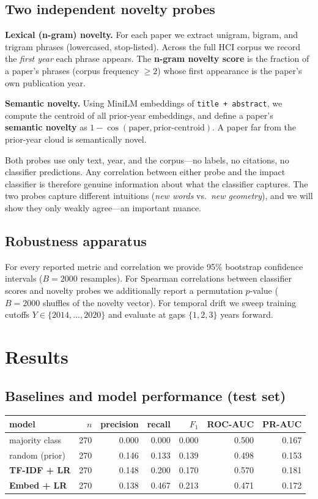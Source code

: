 \documentclass[11pt]{article}
\begin{document}
\subsection{Two independent novelty probes}
\textbf{Lexical (n-gram) novelty.} For each paper we extract unigram, bigram, and trigram phrases (lowercased, stop-listed). Across the full HCI corpus we record the \emph{first year} each phrase appears. The \textbf{n-gram novelty score} is the fraction of a paper's phrases (corpus frequency $\ge 2$) whose first appearance is the paper's own publication year.

\textbf{Semantic novelty.} Using MiniLM embeddings of \texttt{title + abstract}, we compute the centroid of all prior-year embeddings, and define a paper's \textbf{semantic novelty} as $1 - \cos(\text{paper}, \text{prior-centroid})$. A paper far from the prior-year cloud is semantically novel.

Both probes use only text, year, and the corpus---no labels, no citations, no classifier predictions. Any correlation between either probe and the impact classifier is therefore genuine information about what the classifier captures. The two probes capture different intuitions (\emph{new words} vs.\ \emph{new geometry}), and we will show they only weakly agree---an important nuance.

\subsection{Robustness apparatus}
For every reported metric and correlation we provide 95\% bootstrap confidence intervals ($B=2000$ resamples). For Spearman correlations between classifier scores and novelty probes we additionally report a permutation $p$-value ($B=2000$ shuffles of the novelty vector). For temporal drift we sweep training cutoffs $Y \in \{2014, \ldots, 2020\}$ and evaluate at gaps $\{1,2,3\}$ years forward.

\section{Results}
\subsection{Baselines and model performance (test set)}
\begin{table}[h]\centering
\begin{tabular}{lrrrrrr}
\toprule
model & $n$ & precision & recall & $F_1$ & ROC-AUC & PR-AUC \\
\midrule
majority class & 270 & 0.000 & 0.000 & 0.000 & 0.500 & 0.167 \\
random (prior) & 270 & 0.146 & 0.133 & 0.139 & 0.498 & 0.153 \\
\textbf{TF-IDF + LR} & 270 & 0.148 & 0.200 & 0.170 & 0.570 & 0.181 \\
\textbf{Embed + LR}  & 270 & 0.138 & 0.467 & 0.213 & 0.471 & 0.172 \\
\bottomrule
\end{tabular}
\end{table}
\end{document}
